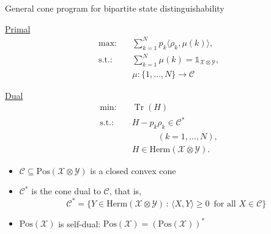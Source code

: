 \documentclass{beamer}
\def\I{\mathds{1}}
\newcommand{\ip}[2]{\langle #1 , #2\rangle}
\newcommand{\tr}{\operatorname{Tr}}
\def\X{\mathcal{X}}
\def\Y{\mathcal{Y}}
\def\C{\mathcal{C}}
\newcommand{\setft}[1]{\mathrm{#1}}
\newcommand{\Pos}{\setft{Pos}}
\newcommand{\Herm}{\setft{Herm}}
\begin{document}
    \begin{frame}{General cone program for bipartite state distinguishability}
        \begin{minipage}[t]{0.48\linewidth}
            \begin{center}
            \underline{Primal}
            \vspace{-5pt}
            \begin{equation*}
              \begin{split}
                \text{max:} \quad & 
                \sum_{k=1}^{N} p_{k}\ip{\rho_{k}}{\mu(k)},\\
                \text{s.t.:} \quad & \sum_{k=1}^{N} \mu(k) = \I_{\X\otimes\Y},\\
                  & \boxed{\mu : \{1,\ldots, N\}\rightarrow \C}
              \end{split}
            \end{equation*}
            \end{center}
        \end{minipage}\hfill
        \begin{minipage}[t]{0.48\linewidth}
            \begin{center}
            \underline{Dual}
            \vspace{5pt}
            \begin{equation*}
              \label{eq:global-dual-problem}
              \begin{split}
                \text{min:} \quad & \tr(H)\\
                \text{s.t.:} \quad & \boxed{H-p_k\rho_k \in \C^{\ast}}\\
                & \quad\qquad(k = 1,\ldots,N),\\
                \quad & H \in \Herm(\X\otimes\Y).
              \end{split}
            \end{equation*}
            \end{center}
        \end{minipage}
        \vspace{20pt}
        \begin{itemize}
            \item $\C\subseteq\Pos(\X\otimes\Y)$ is a closed convex cone
            \item $\C^{\ast}$ is the cone dual to $\C$, that is,
            \[
              \C^{\ast} = \{Y\in\Herm(\X\otimes\Y)\,:\,\ip{X}{Y} \geq 0\;\:\text{for all $X\in\C$}\}
            \]
            \item $\Pos(\X)$ is self-dual: $\Pos(\X) = (\Pos(\X))^{\ast}$
        \end{itemize}
    \end{frame}
\end{document}
